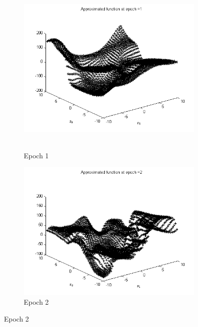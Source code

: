 \documentclass{article}
\begin{document}
\begin{figure}
\begin{subfigure}{.5\textwidth}
  \centering
  \includegraphics[width=.8\linewidth]{Regression/bivariate/2layers_epoch_1.png}\
  \caption{Epoch 1}
\end{subfigure}%
\begin{subfigure}{.5\textwidth}
  \centering
  \includegraphics[width=.8\linewidth]{Regression/bivariate/2layers_epoch_2.png}
   \caption{Epoch 2}
  \end{subfigure}
  

\end{figure}
\end{document}
